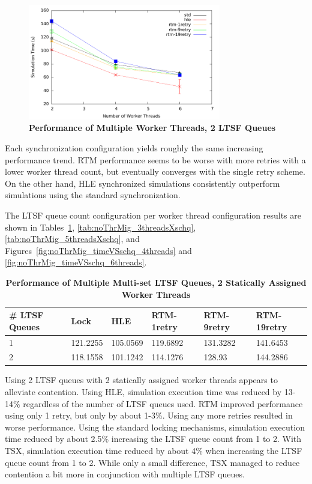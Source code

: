 \documentclass[11pt]{book}
\begin{document}
\begin{figure}
    \centering
    \graphicspath{ {./figures/} }
    \includegraphics[width=0.75\textwidth,keepaspectratio]{hugeepidemicsim-NOmig-timeVSthreads-multiset-2schQ}
    \caption{\textbf{Performance of Multiple Worker Threads, 2 LTSF Queues}}
    \label{fig:noThrMig_timeVSthreads_2schedQ}
\end{figure}

Each synchronization configuration yields roughly the same increasing
performance trend.  RTM performance seems to be worse with more retries with a
lower worker thread count, but eventually converges with the single retry
scheme.  On the other hand, HLE synchronized simulations consistently
outperform simulations using the standard synchronization.  

The LTSF queue count configuration per worker thread configuration results are
shown in Tables~\ref{tab:noThrMig_2threadsXschq},
\ref{tab:noThrMig_3threadsXschq}, \ref{tab:noThrMig_5threadsXschq}, and
Figures~\ref{fig:noThrMig_timeVSschq_4threads} and
\ref{fig:noThrMig_timeVSschq_6threads}.

\begin{table}
    \centering
    \begin{tabular}{l|p{2cm}|p{2cm}|p{2cm}|p{2cm}|p{2cm}}
        \textbf{\# LTSF Queues}&Lock &HLE &RTM-1retry &RTM-9retry &RTM-19retry \\
        \hline
        \midrule
            1 &121.2255  &105.0569 &119.6892 &131.3282 &141.6453 \\ 
            2 &118.1558  &101.1242 &114.1276 &128.93   &144.2886 \\
    \end{tabular}
    \caption{\textbf{Performance of Multiple Multi-set LTSF Queues, 2 Statically Assigned Worker Threads}}
    \label{tab:noThrMig_2threadsXschq}
\end{table}

Using 2 LTSF queues with 2 statically assigned worker threads appears to
alleviate contention.  Using HLE, simulation execution time was reduced by
13-14\% regardless of the number of LTSF queues used.  RTM improved performance
using only 1 retry, but only by about 1-3\%.  Using any more retries resulted in
worse performance.  Using the standard locking mechanisms, simulation execution
time reduced by about 2.5\% increasing the LTSF queue count from 1 to 2.  With
TSX, simulation execution time reduced by about 4\%  when increasing the LTSF
queue count from 1 to 2.  While only a small difference, TSX managed to reduce
contention a bit more in conjunction with multiple LTSF queues.
\end{document}
